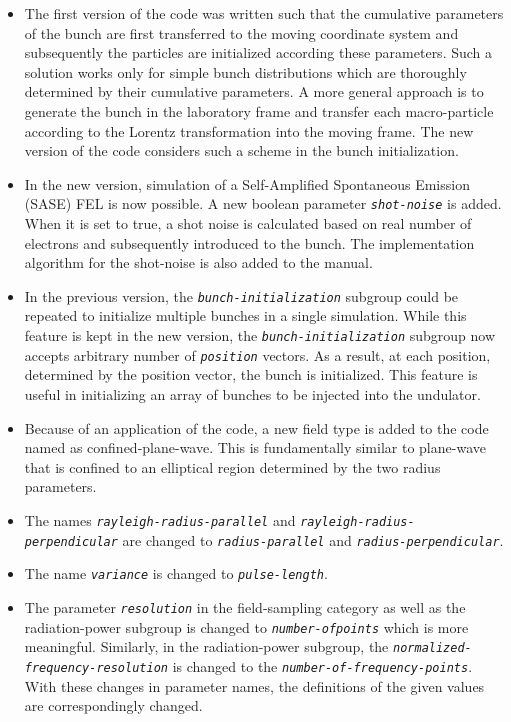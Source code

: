 \begin{itemize}
	\item The first version of the code was written such that the cumulative parameters of the bunch are first transferred to the moving coordinate system and subsequently the particles are initialized according these parameters. Such a solution works only for simple bunch distributions which are thoroughly determined by their cumulative parameters. A more general approach is to generate the bunch in the laboratory frame and transfer each macro-particle according to the Lorentz transformation into the moving frame. The new version of the code considers such a scheme in the bunch initialization.
	\item In the new version, simulation of a Self-Amplified Spontaneous Emission (SASE) FEL is now possible. A new boolean parameter {\tt \small \em shot-noise} is added. When it is set to true, a shot noise is calculated based on real number of electrons and subsequently introduced to the bunch. The implementation algorithm for the shot-noise is also added to the manual.
	\item In the previous version, the {\tt \small \em bunch-initialization} subgroup could be repeated to initialize multiple bunches in a single simulation. While this feature is kept in the new version, the {\tt \small \em bunch-initialization} subgroup now accepts arbitrary number of {\tt \small \em position} vectors. As a result, at each position, determined by the position vector, the bunch is initialized. This feature is useful in initializing an array of bunches to be injected into the undulator.
	\item Because of an application of the code, a new field type is added to the code named as confined-plane-wave. This is fundamentally similar to plane-wave that is confined to an elliptical region determined by the two radius parameters.
	\item The names {\tt \em \small rayleigh-radius-parallel} and {\tt \em \small rayleigh-radius-perpendicular} are changed to {\tt \em \small radius-parallel} and {\tt \em \small radius-perpendicular}.
	\item The name {\tt \em \small variance} is changed to {\tt \em \small pulse-length}.
	\item The parameter {\tt \em \small resolution} in the field-sampling category as well as the radiation-power subgroup is changed to {\tt \em \small number-of\-points} which is more meaningful. Similarly, in the radiation-power subgroup, the {\tt \em \small normalized-frequency-resolution} is changed to the {\tt \em \small number-of-frequency-points}. With these changes in parameter names, the definitions of the given values are correspondingly changed.

\end{itemize}
